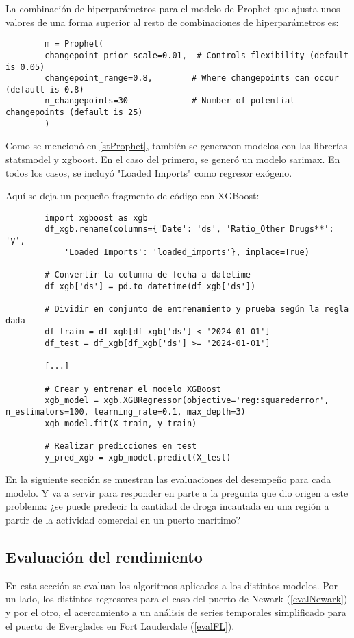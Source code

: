 \documentclass[12pt]{article}
\begin{document}
 	La combinación de hiperparámetros para el modelo de Prophet que ajusta unos valores de una forma superior al resto de combinaciones de hiperparámetros es:
 	
 	\begin{verbatim}
 		m = Prophet(
 		changepoint_prior_scale=0.01,  # Controls flexibility (default is 0.05)
 		changepoint_range=0.8,        # Where changepoints can occur (default is 0.8)
 		n_changepoints=30             # Number of potential changepoints (default is 25)
 		)
 	\end{verbatim}
 
 	Como se mencionó en \ref{stProphet}, también se generaron modelos con las librerías statsmodel y xgboost. En el caso del primero, se generó un modelo sarimax. En todos los casos, se incluyó "Loaded Imports" como regresor exógeno.
 	
 	Aquí se deja un pequeño fragmento de código con XGBoost:
 	\begin{verbatim}
 		import xgboost as xgb
 		df_xgb.rename(columns={'Date': 'ds', 'Ratio_Other Drugs**': 'y', 
 			'Loaded Imports': 'loaded_imports'}, inplace=True)
 		
 		# Convertir la columna de fecha a datetime
 		df_xgb['ds'] = pd.to_datetime(df_xgb['ds'])
 		
 		# Dividir en conjunto de entrenamiento y prueba según la regla dada
 		df_train = df_xgb[df_xgb['ds'] < '2024-01-01']
 		df_test = df_xgb[df_xgb['ds'] >= '2024-01-01']
 		
 		[...]
 		
 		# Crear y entrenar el modelo XGBoost
 		xgb_model = xgb.XGBRegressor(objective='reg:squarederror', n_estimators=100, learning_rate=0.1, max_depth=3)
 		xgb_model.fit(X_train, y_train)
 		
 		# Realizar predicciones en test
 		y_pred_xgb = xgb_model.predict(X_test)
 	\end{verbatim}
 
 	En la siguiente sección se muestran las evaluaciones del desempeño para cada modelo. Y va a servir para responder en parte a la pregunta que dio origen a este problema: ¿se puede predecir la cantidad de droga incautada en una región a partir de la actividad comercial en un puerto marítimo?

	\subsection{\label{eval performance}Evaluación del rendimiento}
	En esta sección se evaluan los algoritmos aplicados a los distintos modelos. Por un lado, los distintos regresores para el caso del puerto de Newark (\ref{evalNewark}) y por el otro, el acercamiento a un análisis de series temporales simplificado para el puerto de Everglades en Fort Lauderdale (\ref{evalFL}).
	
\end{document}
